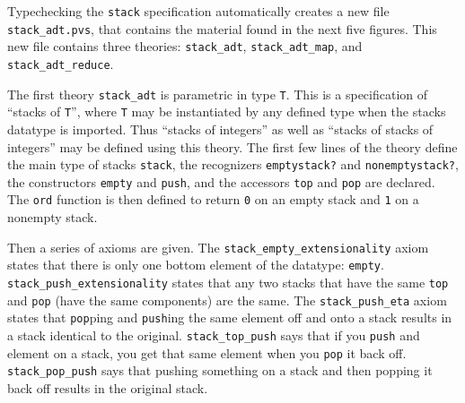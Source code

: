 Typechecking the \texttt{stack} specification automatically creates a new
file \texttt{stack\_adt.pvs}, that contains the material found in
the next five figures.  This new file contains three theories:
\texttt{stack\_adt}, \texttt{stack\_adt\_map}, and
\texttt{stack\_adt\_reduce}.


The first theory \texttt{stack\_adt} is parametric in type \texttt{T}.
This is a specification of ``stacks of \texttt{T}'', where \texttt{T} may
be instantiated by any defined type when the stacks datatype is imported.
Thus ``stacks of integers'' as well as ``stacks of stacks of integers''
may be defined using this theory.  The first few lines of the theory
define the main type of stacks \texttt{stack}, the recognizers
\texttt{emptystack?} and \texttt{nonemptystack?}, the constructors
\texttt{empty} and \texttt{push}, and the accessors \texttt{top} and
\texttt{pop} are declared.  The \texttt{ord} function is then defined to
return \texttt{0} on an empty stack and \texttt{1} on a nonempty stack.

Then a series of axioms are given.  The
\texttt{stack\_empty\_extensionality} axiom states that there is only one
bottom element of the datatype: \texttt{empty}.
\texttt{stack\_push\_extensionality} states that any two stacks that have
the same \texttt{top} and \texttt{pop} (have the same components) are the
same.  The \texttt{stack\_push\_eta} axiom states that \texttt{pop}ping
and \texttt{push}ing the same element off and onto a stack results in a
stack identical to the original.  \texttt{stack\_top\_push} says that if
you \texttt{push} and element on a stack, you get that same element when
you \texttt{pop} it back off.  \texttt{stack\_pop\_push} says that pushing
something on a stack and then popping it back off results in the original
stack.

